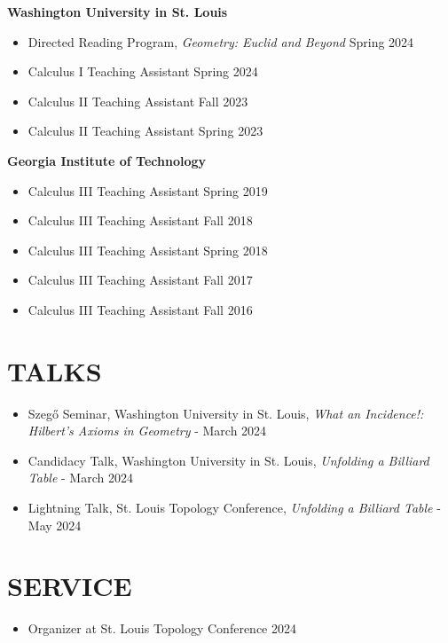 \documentclass[a4paper,11pt]{extarticle}
\begin{document}
\textbf{Washington University in St. Louis}

\begin{itemize}
    \item Directed Reading Program, \emph{Geometry: Euclid and Beyond}
    \hfill Spring 2024
    \item Calculus I Teaching Assistant
    \hfill Spring 2024
    \item Calculus II Teaching Assistant \hfill Fall 2023
    \item Calculus II Teaching Assistant \hfill Spring 2023
\end{itemize}

\noindent
\textbf{Georgia Institute of Technology}

\begin{itemize}
    \item Calculus III Teaching Assistant \hfill Spring 2019
    \item Calculus III Teaching Assistant \hfill Fall 2018
    \item Calculus III Teaching Assistant \hfill Spring 2018
    \item Calculus III Teaching Assistant \hfill Fall 2017
    \item Calculus III Teaching Assistant \hfill Fall 2016
\end{itemize}

\section*{TALKS}
\begin{itemize}
    \item Szegő Seminar, Washington University in St. Louis, \emph{What an Incidence!: Hilbert's Axioms in Geometry} - March 2024
    \item Candidacy Talk, Washington University in St. Louis, \emph{Unfolding a Billiard Table} - March 2024
    \item Lightning Talk, St. Louis Topology Conference, \emph{Unfolding a Billiard Table} - May 2024
\end{itemize}

\section*{SERVICE}
\begin{itemize}
    \item Organizer at St. Louis Topology Conference 2024
\end{itemize}


\end{document}
